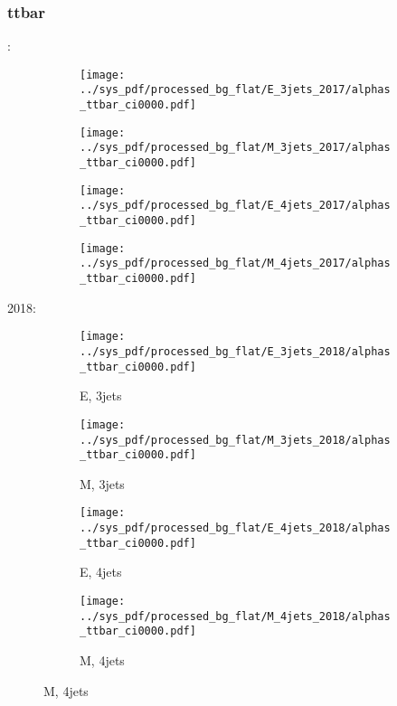 \documentclass{beamer}
\begin{document}
\begin{frame}
\frametitle{ttbar}
\fontsize{5}{1}:
\begin{figure}
\centering
\begin{subfigure}[b]{0.24\textwidth}
\texttt{[image: ../sys\_pdf/processed\_bg\_flat/E\_3jets\_2017/alphas\_ttbar\_ci0000.pdf]}
\end{subfigure}
\begin{subfigure}[b]{0.24\textwidth}
\texttt{[image: ../sys\_pdf/processed\_bg\_flat/M\_3jets\_2017/alphas\_ttbar\_ci0000.pdf]}
\end{subfigure}
\begin{subfigure}[b]{0.24\textwidth}
\texttt{[image: ../sys\_pdf/processed\_bg\_flat/E\_4jets\_2017/alphas\_ttbar\_ci0000.pdf]}
\end{subfigure}
\begin{subfigure}[b]{0.24\textwidth}
\texttt{[image: ../sys\_pdf/processed\_bg\_flat/M\_4jets\_2017/alphas\_ttbar\_ci0000.pdf]}
\end{subfigure}
\end{figure}
2018:
\begin{figure}
\centering
\begin{subfigure}[b]{0.24\textwidth}
\texttt{[image: ../sys\_pdf/processed\_bg\_flat/E\_3jets\_2018/alphas\_ttbar\_ci0000.pdf]}
\captionsetup{font=tiny}
\caption{E, 3jets}
\end{subfigure}
\begin{subfigure}[b]{0.24\textwidth}
\texttt{[image: ../sys\_pdf/processed\_bg\_flat/M\_3jets\_2018/alphas\_ttbar\_ci0000.pdf]}
\captionsetup{font=tiny}
\caption{M, 3jets}
\end{subfigure}
\begin{subfigure}[b]{0.24\textwidth}
\texttt{[image: ../sys\_pdf/processed\_bg\_flat/E\_4jets\_2018/alphas\_ttbar\_ci0000.pdf]}
\captionsetup{font=tiny}
\caption{E, 4jets}
\end{subfigure}
\begin{subfigure}[b]{0.24\textwidth}
\texttt{[image: ../sys\_pdf/processed\_bg\_flat/M\_4jets\_2018/alphas\_ttbar\_ci0000.pdf]}
\captionsetup{font=tiny}
\caption{M, 4jets}
\end{subfigure}
\end{figure}
\end{frame}
\end{document}
